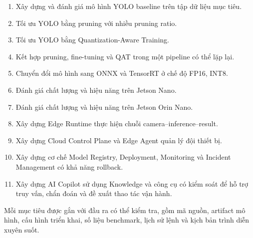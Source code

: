 \begin{enumerate}
  \item Xây dựng và đánh giá mô hình YOLO baseline trên tập dữ liệu mục tiêu.
  \item Tối ưu YOLO bằng pruning với nhiều pruning ratio.
  \item Tối ưu YOLO bằng Quantization-Aware Training.
  \item Kết hợp pruning, fine-tuning và QAT trong một pipeline có thể lặp lại.
  \item Chuyển đổi mô hình sang ONNX và TensorRT ở chế độ FP16, INT8.
  \item Đánh giá chất lượng và hiệu năng trên Jetson Nano.
  \item Đánh giá chất lượng và hiệu năng trên Jetson Orin Nano.
  \item Xây dựng Edge Runtime thực hiện chuỗi camera--inference--result.
  \item Xây dựng Cloud Control Plane và Edge Agent quản lý đội thiết bị.
  \item Xây dựng cơ chế Model Registry, Deployment, Monitoring và Incident
        Management có khả năng rollback.
  \item Xây dựng AI Copilot sử dụng Knowledge và công cụ có kiểm soát để hỗ
        trợ truy vấn, chẩn đoán và đề xuất thao tác vận hành.
\end{enumerate}

Mỗi mục tiêu được gắn với đầu ra có thể kiểm tra, gồm mã nguồn, artifact mô
hình, cấu hình triển khai, số liệu benchmark, lịch sử lệnh và kịch bản trình diễn
xuyên suốt.